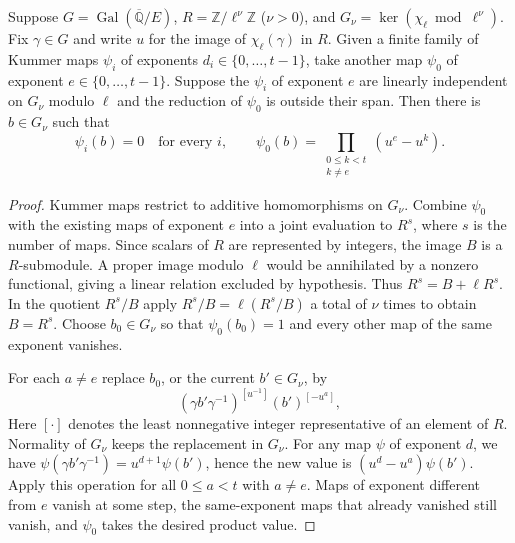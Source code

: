 \begin{lemma}
\label{lem:c-triangle-separate-kummer}
\emitthmsource
Suppose $G=\operatorname{Gal}(\overline{\mathbb Q}/E)$, $R=\mathbb Z/\ell^\nu\mathbb Z$ ($\nu>0$), and $G_\nu=\ker(\chi_\ell\bmod\ell^\nu)$. Fix $\gamma\in G$ and write $u$ for the image of $\chi_\ell(\gamma)$ in $R$.
Given a finite family of Kummer maps $\psi_i$ of exponents $d_i\in\{0,\ldots,t-1\}$, take another map $\psi_0$ of exponent $e\in\{0,\ldots,t-1\}$. Suppose the $\psi_i$ of exponent $e$ are linearly independent on $G_\nu$ modulo $\ell$ and the reduction of $\psi_0$ is outside their span. Then there is $b\in G_\nu$ such that
\[
  \psi_i(b)=0\quad\text{for every }i,\qquad
  \psi_0(b)=\prod_{\substack{0\le k<t\\k\ne e}}(u^e-u^k).
\]
\end{lemma}
\begin{proof}
Kummer maps restrict to additive homomorphisms on $G_\nu$. Combine $\psi_0$ with the existing maps of exponent $e$ into a joint evaluation to $R^s$, where $s$ is the number of maps. Since scalars of $R$ are represented by integers, the image $B$ is a $R$-submodule. A proper image modulo $\ell$ would be annihilated by a nonzero functional, giving a linear relation excluded by hypothesis. Thus $R^s=B+\ell R^s$. In the quotient $R^s/B$ apply $R^s/B=\ell(R^s/B)$ a total of $\nu$ times to obtain $B=R^s$. Choose $b_0\in G_\nu$ so that $\psi_0(b_0)=1$ and every other map of the same exponent vanishes.

For each $a\ne e$ replace $b_0$, or the current $b'\in G_\nu$, by
\[
  (\gamma b'\gamma^{-1})^{[u^{-1}]}(b')^{[-u^a]},
\]
Here $[\cdot]$ denotes the least nonnegative integer representative of an element of $R$. Normality of $G_\nu$ keeps the replacement in $G_\nu$. For any map $\psi$ of exponent $d$, we have $\psi(\gamma b'\gamma^{-1})=u^{d+1}\psi(b')$, hence the new value is $(u^d-u^a)\psi(b')$. Apply this operation for all $0\le a<t$ with $a\ne e$. Maps of exponent different from $e$ vanish at some step, the same-exponent maps that already vanished still vanish, and $\psi_0$ takes the desired product value.
\end{proof}

